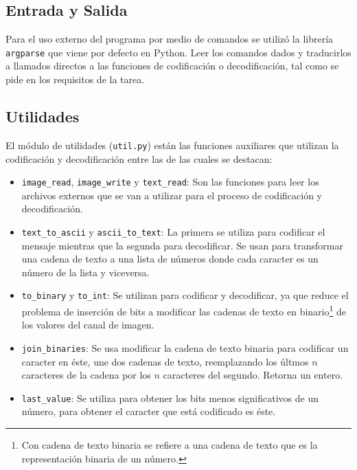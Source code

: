 \documentclass[conference]{IEEEtran}
\begin{document}
\subsection*{Entrada y Salida}
    Para el uso externo del programa por medio de comandos se utilizó la librería \texttt{argparse} que viene por defecto en Python. Leer los comandos dados y traducirlos a llamados directos a las funciones de codificación o decodificación, tal como se pide en los requisitos de la tarea.
    	
	\subsection*{Utilidades}
	El módulo de utilidades (\texttt{util.py}) están las funciones auxiliares que utilizan la codificación y decodificación entre las de las cuales se destacan:
	\begin{itemize}
	    \item \texttt{image\_read}\footnotemark, \texttt{image\_write} y \texttt{text\_read}: Son las funciones para leer los archivos externos que se van a utilizar para el proceso de codificación y decodificación.
         
	    	    
        \item \texttt{text\_to\_ascii} y \texttt{ascii\_to\_text}: La primera se utiliza para codificar el mensaje mientras que la segunda para decodificar. Se usan para transformar una cadena de texto a una lista de números donde cada caracter es un número de la lista y viceversa.
        
        \item \texttt{to\_binary} y \texttt{to\_int}: Se utilizan para codificar y decodificar, ya que reduce el problema de inserción de bits a modificar las cadenas de texto en binario\footnote{Con cadena de texto binaria se refiere a una cadena de texto que es la representación binaria de un número.} de los valores del canal de imagen.
        
        \item \texttt{join\_binaries}: Se usa modificar la cadena de texto binaria para codificar un caracter en éste, une dos cadenas de texto, reemplazando los últmos $n$ caracteres de la cadena por los $n$ caracteres del segundo. Retorna un entero.
        
        \item \texttt{last\_value}: Se utiliza para obtener los bits menos significativos de un número, para obtener el caracter que está codificado es éste.
	\end{itemize}
	
\end{document}
